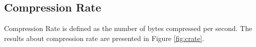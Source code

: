 \subsection{Compression Rate}

Compression Rate is defined as the number of bytes compressed per second. 
The results about compression rate are presented in Figure \ref{fig:crate}.

